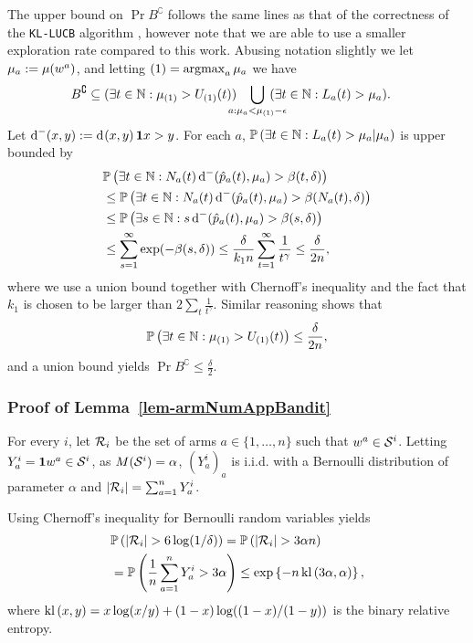 The upper bound on $\Pr{B^\complement}$ follows the same lines as that of the correctness of the \texttt{KL-LUCB} algorithm \citep{COLT13}, however note that we are able to use a smaller exploration rate compared to this work.
	Abusing notation slightly we let $\mu_a := \mu(w^a)$,
	and letting $(1) = \operatorname*{argmax}_a \mu_a$ we have
\begin{align*}
 B^\complement & \subseteq  (\exists t \in \N : \ArmMean_{(1)} > U_{(1)}(t)) \!\!\!\!\!\bigcup_{a : \ArmMean_a < \ArmMean_{(1)} - \epsilon} \!\!\!\!\!\!\!\! (\exists t \in \N: L_a(t) > \ArmMean_a).
\end{align*}
Let $\operatorname{d}^-(x,y) := \operatorname{d}\hspace{-.1em}\left( x, y \right)\mathbf{1}{x > y}$.
For each $a$, $\mathbb{P}\left( \exists t\in \mathbb{N}: L_a(t) > \mu_a | \mu_a \right)$ is upper bounded by
\begin{align*}
&\mathbb{P}\left(  \exists t \in \mathbb{N} : N_a(t) \operatorname{d}^-(\hat{p}_a(t),\mu_a) > \beta(t,\delta)  \right) \\
& \leq   \mathbb{P}\left(  \exists t \in \mathbb{N} : N_a(t) \operatorname{d}^-(\hat{p}_a(t),\mu_a) > \beta(N_a(t),\delta)  \right) \\
& \leq   \mathbb{P}\left(  \exists s \in \mathbb{N} : s \operatorname{d}^-(\hat{p}_a(t),\mu_a) > \beta(s,\delta)  \right) \\
& \leq  \sum_{s=1}^\infty \exp(-\beta(s,\delta)) \leq \frac{\delta}{k_1 n}\sum_{t=1}^\infty \frac{1}{t^\gamma} \leq \frac{\delta}{2n},
\end{align*}
where we use a union bound together with Chernoff's inequality and the fact that $k_1$ is chosen to be larger than $2 \sum_{t}\frac{1}{t^\gamma}$. Similar reasoning shows that
\begin{align*}
\mathbb{P}\left( \exists t \in \mathbb{N} : \mu_{(1)} > U_{(1)}(t) \right)
	\leq \frac{\delta}{2n},
\end{align*}
and a union bound yields $\Pr{B^\complement} \leq \frac{\delta}{2}$.

\subsubsection{Proof of Lemma~\ref{lem-armNumAppBandit}}\label{proof:armNumAppBandit}

For every $i$, let $\mathcal{R}_i$ be the set of arms $a \in \{1,\dots,n\}$ such that $w^a \in \mathcal{S}^{i}$. Letting $Y^i_a = \mathbf{1}{w^a \in \mathcal{S}^{i}}$, as $M(\mathcal{S}^{i}) = \alpha$, $(Y^i_a)_a$ is i.i.d. with a Bernoulli distribution of parameter $\alpha$ and 
$|\mathcal{R}_i| = \sum_{a=1}^n Y^i_a$. 

Using Chernoff's inequality for Bernoulli random variables yields 
\begin{align*}
 &\mathbb{P}\left(  |\mathcal{R}_i| > 6 \log(1/\delta)  \right)
 	= \mathbb{P}\left(  |\mathcal{R}_i| > 3\alpha n  \right) \\
 & =  \mathbb{P}\left(  \frac{1}{n}\sum_{a=1}^n Y^i_a > 3\alpha  \right)
 	\leq \exp\left\{-n\operatorname{kl}\left( 3\alpha, \alpha \right)\right\},
\end{align*}
where $\operatorname{kl}\left( x, y \right)=x\log(x/y) + (1-x)\log((1-x)/(1-y))$ is the binary relative entropy. 

